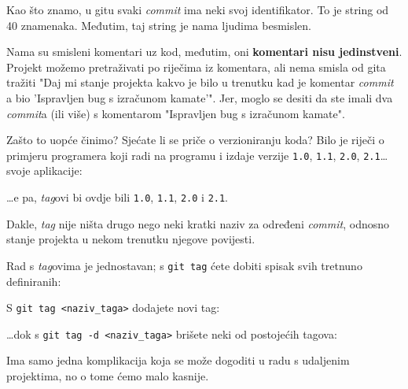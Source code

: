 Kao što znamo, u gitu svaki \emph{commit} ima neki svoj identifikator. 
To je string od 40 znamenaka.
Međutim, taj string je nama ljudima besmislen.

Nama su smisleni komentari uz kod, međutim, oni \textbf{komentari nisu jedinstveni}.
Projekt možemo pretraživati po riječima iz komentara, ali nema smisla od gita tražiti "Daj mi stanje projekta kakvo je bilo u trenutku kad je komentar \emph{commit} a bio 'Ispravljen bug s izračunom kamate'".
Jer, moglo se desiti da ste imali dva \emph{commit}a (ili više) s komentarom "Ispravljen bug s izračunom kamate".

Zašto to uopće činimo?
Sjećate li se priče o verzioniranju koda?
Bilo je riječi o primjeru programera koji radi na programu i izdaje verzije \verb+1.0+, \verb+1.1+, \verb+2.0+, \verb+2.1+\dots svoje aplikacije:



\dots{}e pa, \emph{tag}ovi bi ovdje bili \verb+1.0+, \verb+1.1+, \verb+2.0+ i \verb+2.1+.

Dakle, \emph{tag} nije ništa drugo nego neki kratki naziv za određeni \emph{commit}, odnosno stanje projekta u nekom trenutku njegove povijesti.

Rad s \emph{tag}ovima je jednostavan; s \verb+git tag+ ćete dobiti spisak svih tretnuno definiranih:



S \verb+git tag <naziv_taga>+ dodajete novi tag:


\dots{}dok s \verb+git tag -d <naziv_taga>+ brišete neki od postojećih tagova:


Ima samo jedna komplikacija koja se može dogoditi u radu s udaljenim projektima, no o tome ćemo malo kasnije.
